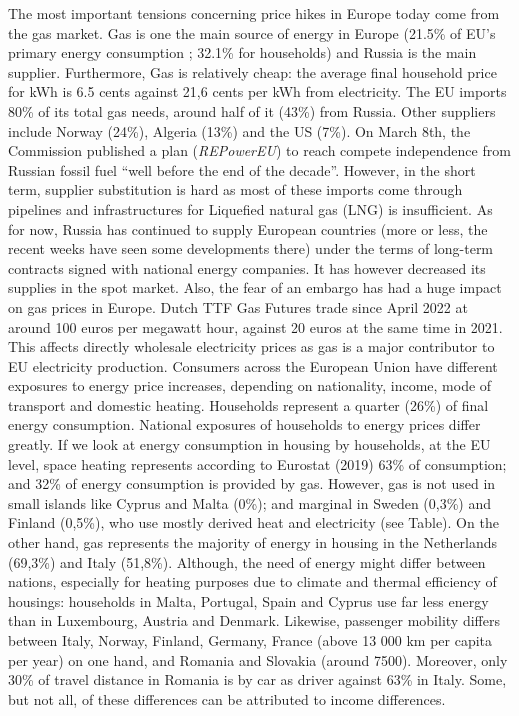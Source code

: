 \documentclass[
  9pt,
  a4paper,
  DIV=11,
  numbers=noendperiod,
  oneside]{scrartcl}
\begin{document}
The most important tensions concerning price hikes in Europe today come
from the gas market. Gas is one the main source of energy in Europe
(21.5\% of EU's primary energy consumption ; 32.1\% for households) and
Russia is the main supplier. Furthermore, Gas is relatively cheap: the
average final household price for kWh is 6.5 cents against 21,6 cents
per kWh from electricity. The EU imports 80\% of its total gas needs,
around half of it (43\%) from Russia. Other suppliers include Norway
(24\%), Algeria (13\%) and the US (7\%). On March 8th, the Commission
published a plan (\emph{REPowerEU}) to reach compete independence from
Russian fossil fuel ``well before the end of the decade''. However, in
the short term, supplier substitution is hard as most of these imports
come through pipelines and infrastructures for Liquefied natural gas
(LNG) is insufficient. As for now, Russia has continued to supply
European countries (more or less, the recent weeks have seen some
developments there) under the terms of long-term contracts signed with
national energy companies. It has however decreased its supplies in the
spot market. Also, the fear of an embargo has had a huge impact on gas
prices in Europe. Dutch TTF Gas Futures trade since April 2022 at around
100 euros per megawatt hour, against 20 euros at the same time in 2021.
This affects directly wholesale electricity prices as gas is a major
contributor to EU electricity production. Consumers across the European
Union have different exposures to energy price increases, depending on
nationality, income, mode of transport and domestic heating. Households
represent a quarter (26\%) of final energy consumption. National
exposures of households to energy prices differ greatly. If we look at
energy consumption in housing by households, at the EU level, space
heating represents according to Eurostat (2019) 63\% of consumption; and
32\% of energy consumption is provided by gas. However, gas is not used
in small islands like Cyprus and Malta (0\%); and marginal in Sweden
(0,3\%) and Finland (0,5\%), who use mostly derived heat and electricity
(see Table). On the other hand, gas represents the majority of energy in
housing in the Netherlands (69,3\%) and Italy (51,8\%). Although, the
need of energy might differ between nations, especially for heating
purposes due to climate and thermal efficiency of housings: households
in Malta, Portugal, Spain and Cyprus use far less energy than in
Luxembourg, Austria and Denmark. Likewise, passenger mobility differs
between Italy, Norway, Finland, Germany, France (above 13 000 km per
capita per year) on one hand, and Romania and Slovakia (around
7500).
Moreover, only 30\% of travel distance in Romania is by car as driver
against 63\% in Italy. Some, but not all, of these differences can be
attributed to income differences.
\end{document}
